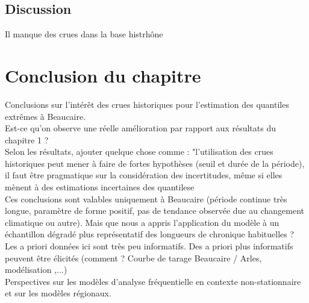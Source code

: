 \documentclass[11pt]{article}
\begin{document}
	\subsection{Discussion}
	
	Il manque des crues dans la base histrhône
	
\section{Conclusion du chapitre}
	Conclusions sur l'intérêt des crues historiques pour l'estimation des quantiles extrêmes à Beaucaire. \\
	Est-ce qu'on observe une réelle amélioration par rapport aux résultats du chapitre 1 ?\\
	Selon les résultats, ajouter quelque chose comme : "l'utilisation des crues historiques peut mener à faire de fortes hypothèses (seuil et durée de la période), il faut être pragmatique sur la considération des incertitudes, même si elles mènent à des estimations incertaines des quantilese\\
	Ces conclusions sont valables uniquement à Beaucaire (période continue très longue, paramètre de forme positif, pas de tendance observée due au changement climatique ou autre). Mais que nous a appris l'application du modèle à un échantillon dégradé plus représentatif des longueurs de chronique habituelles ?\\
	Les a priori données ici sont très peu informatifs. Des a priori plus informatifs peuvent être élicités (comment ? Courbe de tarage Beaucaire / Arles, modélisation ,...) \\
	Perspectives sur les modèles d'analyse fréquentielle en contexte non-stationnaire et sur les modèles régionaux.  

\printbibliography[title=Bibliographie]
\end{document}
